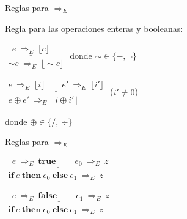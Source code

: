 \documentclass[handout]{beamer}
\begin{document}
\begin{frame}{Reglas para $\Rightarrow_E$}


Regla para las operaciones enteras y booleanas:

\bigskip

$\begin{array}{c}
\underline{\ \ e\ \Rightarrow_E\ \lfloor c\rfloor\ \ }\\
\sim e\ \Rightarrow_E\ \lfloor \sim c\rfloor
\end{array}
$
donde $\sim\in \{-,\neg\}$ \pause

\bigskip


\bigskip


$\begin{array}{c}
\underline{e\ \Rightarrow_E\ \lfloor i\rfloor\qquad e'\ \Rightarrow_E\ \lfloor i'\rfloor}\\
e \oplus e'\ \Rightarrow_E\ \lfloor i\oplus i'\rfloor
\end{array}
$
($i'\neq 0$)

\qquad\qquad\qquad\qquad\qquad\qquad donde $\oplus\in \{/,\ \div\}$


\end{frame}





\begin{frame}{Reglas para $\Rightarrow_E$}


\bigskip

$\begin{array}{c}
\underline{\ \ e\ \Rightarrow_E\ \textbf{true}\ \qquad e_0\ \Rightarrow_E\ z }\\
\textbf{if}\ e\ \textbf{then}\ e_0\  \textbf{else}\ e_1\ \Rightarrow_E\ z
\end{array}
$

\bigskip

\bigskip

$\begin{array}{c}
\underline{\ \ e\ \Rightarrow_E\ \textbf{false}\ \qquad e_1\ \Rightarrow_E\ z }\\
\textbf{if}\ e\ \textbf{then}\ e_0\  \textbf{else}\ e_1\ \Rightarrow_E\ z
\end{array}
$ \pause



\end{frame}
\end{document}
